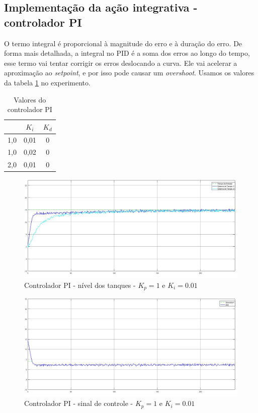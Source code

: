 \documentclass[
	12pt,				%
	openany,			%
	oneside,			%
	a4paper,			%
	english,			%
	french,				%
	spanish,			%
	brazil,				%
	]{abntex2}
\begin{document}
{\subsection{Implementação da ação integrativa - controlador PI}

O termo integral é proporcional à magnitude do erro e à duração do erro. De forma mais detalhada, a integral no PID é a soma dos erros ao longo do tempo, esse termo vai tentar corrigir os erros deslocando a curva. Ele vai acelerar a aproximação ao \textit{setpoint}, e por isso pode causar um \textit{overshoot}. Usamos os valores da tabela \ref{tab:tabelaPI} no experimento.

\begin{table}[h]
\centering
\begin{tabular}{ccc}
\multicolumn{0}{c}{} $K_p$ & $K_i$ & $K_d$ \\\hline
                    1,0 & 0,01 & 0 \\
                    1,0 & 0,02 & 0 \\
                    2,0 & 0,01 & 0
\end{tabular}
\caption{Valores do controlador PI}
\label{tab:tabelaPI}
\end{table}

\begin{figure}[h]
	\centering
	\includegraphics[scale=0.30]{1 - nivel_PI_1kp_001ki.jpg}
	\caption{Controlador PI - nível dos tanques - $K_p = 1$ e $K_i = 0.01$}
	\label{fig:controladorPI_1}
\end{figure}

\begin{figure}[h]
	\centering
	\includegraphics[scale=0.30]{1 - PI sinal_controle.jpg}
	\caption{Controlador PI - sinal de controle - $K_p = 1$ e $K_i = 0.01$}
	\label{fig:sinal_controladorPI_1}
\end{figure}

}
\end{document}
